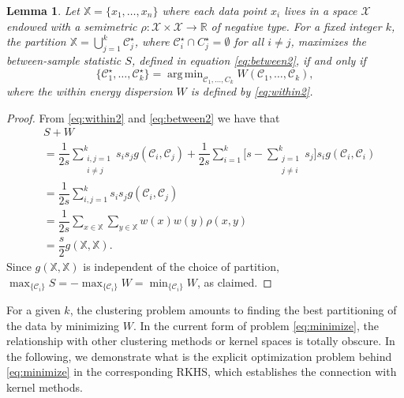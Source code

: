 \documentclass[10pt,journal,compsoc]{IEEEtran}
\newtheorem{lemma}[theorem]{Lemma}
\DeclareMathOperator*{\argmin}{arg\,min}
\newcommand\C{{\mathcal{C}}}
\begin{document}
\begin{lemma}
\label{th:minimize}
Let $\mathbb{X} = \{x_1,\dotsc,x_n\}$ where each data point
$x_i$ lives in a space $\mathcal{X}$ endowed with a semimetric $\rho:
\mathcal{X}\times\mathcal{X} \to \mathbb{R}$ of
negative type. For a fixed integer $k$,
the partition
$\mathbb{X} = \bigcup_{j=1}^k \C^\star_j$, where 
$\C^\star_i \cap C^\star_j = \emptyset$ for
all $i\ne j$, maximizes the between-sample statistic $S$, defined
in equation \eqref{eq:between2}, if and only if
\begin{equation}
\label{eq:minimize}
\{ \C_1^\star,\dotsc,\C_k^\star \} = \argmin_{\C_1,\dotsc,C_k  } W(
\C_1, \dotsc, \C_k) ,
\end{equation}
where the within energy dispersion $W$ is defined by \eqref{eq:within2}.
\end{lemma}
\begin{proof}
From \eqref{eq:within2} and \eqref{eq:between2}
we have that
\begin{align}
& S + W  
\nonumber \\
&= \dfrac{1}{2s} \sum_{\substack{i,j=1 \\ i\ne j}}^k s_i s_j g(\C_i, \C_j)
+ \dfrac{1}{2s} \sum_{i=1}^{k} 
\bigg[ s - 
\sum_{\substack{j= 1 \\ j\ne i}}^k s_j \bigg] 
s_i g(\C_i, \C_i) 
\nonumber \\
& = \dfrac{1}{2s} \sum_{i,j=1}^k s_i s_j g(\C_i, \C_j) 
\nonumber \\
& = \dfrac{1}{2s} \sum_{x \in \mathbb{X}} \sum_{y \in \mathbb{X}} 
w(x) w(y)\rho(x,y)  
\nonumber \\
&= \dfrac{s}{2} g(\mathbb{X}, \mathbb{X}).
\end{align}
Since $g(\mathbb{X}, \mathbb{X})$ is independent 
of the choice of partition, $\max_{\{ \C_i \}} S = - \max_{\{\C_i\}} W = 
\min_{\{ \C_i \}}W$, as claimed.
\end{proof}

For a given $k$, the clustering problem amounts to
finding the best partitioning of the data by minimizing $W$.
In the current form of problem \eqref{eq:minimize},
the relationship
with other clustering methods or kernel spaces is totally obscure.
In the following, we demonstrate what is the explicit 
optimization problem behind 
\eqref{eq:minimize} in the corresponding RKHS, 
which establishes the connection with kernel methods.
\end{document}
